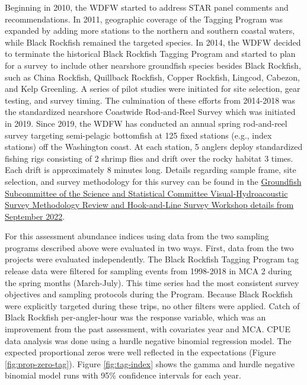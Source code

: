 \documentclass[11pt,
  english,
  letterpaper,
]{article}
\begin{document}
Beginning in 2010, the WDFW started to address STAR panel comments and recommendations. In 2011, geographic coverage of the Tagging Program was expanded by adding more stations to the northern and southern coastal waters, while Black Rockfish remained the targeted species. In 2014, the WDFW decided to terminate the historical Black Rockfish Tagging Program and started to plan for a survey to include other nearshore groundfish species besides Black Rockfish, such as China Rockfish, Quillback Rockfish, Copper Rockfish, Lingcod, Cabezon, and Kelp Greenling. A series of pilot studies were initiated for site selection, gear testing, and survey timing. The culmination of these efforts from 2014-2018 was the standardized nearshore Coastwide Rod-and-Reel Survey which was initiated in 2019. Since 2019, the WDFW has conducted an annual spring rod-and-reel survey targeting semi-pelagic bottomfish at 125 fixed stations (e.g., index stations) off the Washington coast. At each station, 5 anglers deploy standardized fishing rigs consisting of 2 shrimp flies and drift over the rocky habitat 3 times. Each drift is approximately 8 minutes long. Details regarding sample frame, site selection, and survey methodology for this survey can be found in the \href{https://www.pcouncil.org/documents/2022/10/h-4-a-supplemental-ssc-groundfish-subcommittee-report-2-odfw-video-hydroacoustic-survey-methodology-review-and-wdfw-hook-and-line-survey-workshop-report.pdf/}{Groundfish Subcommittee of the Science and Statistical Committee Visual-Hydroacoustic Survey Methodology Review and Hook-and-Line Survey Workshop details from September 2022}.

For this assessment abundance indices using data from the two sampling programs described above were evaluated in two ways. First, data from the two projects were evaluated independently. The Black Rockfish Tagging Program tag release data were filtered for sampling events from 1998-2018 in MCA 2 during the spring months (March-July). This time series had the most consistent survey objectives and sampling protocols during the Program. Because Black Rockfish were explicitly targeted during these trips, no other filters were applied. Catch of Black Rockfish per-angler-hour was the response variable, which was an improvement from the past assessment, with covariates year and MCA. CPUE data analysis was done using a hurdle negative binomial regression model. The expected proportional zeros were well reflected in the expectations (Figure \ref{fig:prop-zero-tag}). Figure \ref{fig:tag-index} shows the gamma and hurdle negative binomial model runs with 95\% confidence intervals for each year.
\end{document}
